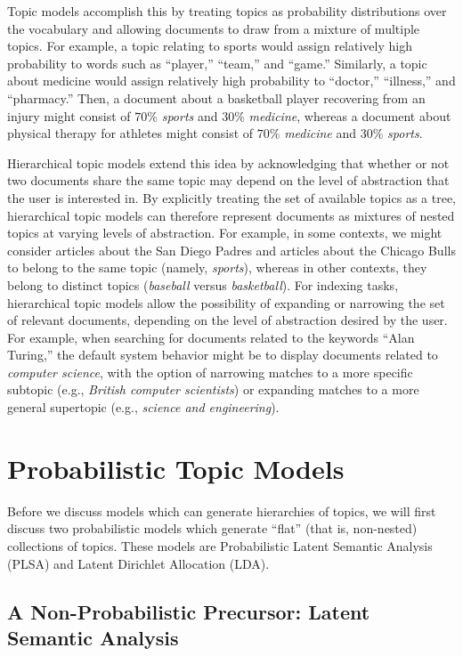 \documentclass{article}
\begin{document}
Topic models accomplish this by treating topics as probability distributions over the vocabulary and allowing documents to draw from a mixture of multiple topics.
For example, a topic relating to sports would assign relatively high probability to words such as ``player,'' ``team,'' and ``game.''
Similarly, a topic about medicine would assign relatively high probability to ``doctor,'' ``illness,'' and ``pharmacy.''
Then, a document about a basketball player recovering from an injury might consist of $70\%$ \emph{sports} and $30\%$ \emph{medicine}, whereas a document about physical therapy for athletes might consist of $70\%$ \emph{medicine} and $30\%$ \emph{sports}.

Hierarchical topic models extend this idea by acknowledging that whether or not two documents share the same topic may depend on the level of abstraction that the user is interested in.
By explicitly treating the set of available topics as a tree, hierarchical topic models can therefore represent documents as mixtures of nested topics at varying levels of abstraction.
For example, in some contexts, we might consider articles about the San Diego Padres and articles about the Chicago Bulls to belong to the same topic (namely, \emph{sports}), whereas in other contexts, they belong to distinct topics (\emph{baseball} versus \emph{basketball}).
For indexing tasks, hierarchical topic models allow the possibility of expanding or narrowing the set of relevant documents, depending on the level of abstraction desired by the user.
For example, when searching for documents related to the keywords ``Alan Turing,'' the default system behavior might be to display documents related to \emph{computer science}, with the option of narrowing matches to a more specific subtopic (e.g., \emph{British computer scientists}) or expanding matches to a more general supertopic (e.g., \emph{science and engineering}).

\section{Probabilistic Topic Models}

Before we discuss models which can generate hierarchies of topics, we will first discuss two probabilistic models which generate ``flat'' (that is, non-nested) collections of topics.
These models are Probabilistic Latent Semantic Analysis (PLSA) and Latent Dirichlet Allocation (LDA).

\subsection{A Non-Probabilistic Precursor: Latent Semantic Analysis}
\end{document}
